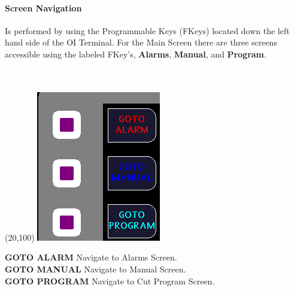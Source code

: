 \paragraph{Screen Navigation}Is performed by using the Programmable Keys (FKeys) located down the left hand side of the OI Terminal. For the Main Screen there are three screens accessible using the labeled FKey's, \textbf{Alarms}, \textbf{Manual}, and \textbf{Program}.
\\
\\
\\
\begin{minipage}{5cm}
	\begin{picture}(20,100)
	\includegraphics[width=.5\linewidth]{screen-captures/main-nav}
	\end{picture}
\end{minipage}\begin{minipage}[]{15cm}
	\textbf{GOTO ALARM} Navigate to Alarms Screen.
	\\
	\textbf{GOTO MANUAL} Navigate to Manual Screen.
	\\
	\textbf{GOTO PROGRAM} Navigate to Cut Program Screen.
\end{minipage}
\\
